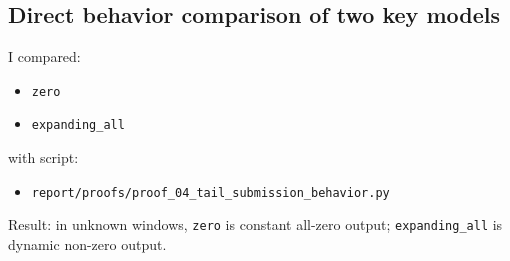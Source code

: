 \subsection{Direct behavior comparison of two key models}
I compared:
\begin{itemize}[leftmargin=1.5em]
  \item \texttt{zero}
  \item \texttt{expanding\_all}
\end{itemize}
with script:
\begin{itemize}[leftmargin=1.5em]
  \item \texttt{report/proofs/proof\_04\_tail\_submission\_behavior.py}
\end{itemize}

Result: in unknown windows, \texttt{zero} is constant all-zero output; \texttt{expanding\_all} is dynamic non-zero output.
